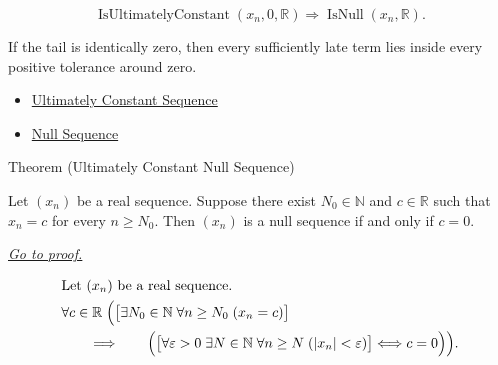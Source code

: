 \begin{remark*}
\[
\operatorname{IsUltimatelyConstant}(x_n,0,\mathbb{R})
\Longrightarrow
\operatorname{IsNull}(x_n,\mathbb{R}).
\]
\end{remark*}

\begin{remark*}[Interpretation]
If the tail is identically zero, then every sufficiently late term lies inside
every positive tolerance around zero.
\end{remark*}

\begin{dependencies}
\begin{itemize}
  \item \hyperref[def:ultimately-constant-sequence]{Ultimately Constant Sequence}
  \item \hyperref[def:null-sequence]{Null Sequence}
\end{itemize}
\end{dependencies}


\begin{theorembox}{Theorem (Ultimately Constant Null Sequence)}
\begin{theorem}
\label{thm:ultimately-constant-null-sequence}
Let $(x_n)$ be a real sequence. Suppose there exist $N_0 \in \mathbb{N}$
and $c \in \mathbb{R}$ such that $x_n = c$ for every $n \ge N_0$. Then
$(x_n)$ is a null sequence if and only if $c = 0$.

\smallskip
\noindent
\hyperref[prf:ultimately-constant-null-sequence]{\textit{Go to proof.}}
\end{theorem}
\end{theorembox}

\begin{remark*}
\[
\begin{aligned}
&\text{Let } (x_n) \text{ be a real sequence.}\\
&\forall c \in \mathbb{R}\;
\Bigl(
\bigl[
\exists N_0 \in \mathbb{N}\;
\forall n \ge N_0\;(x_n = c)
\bigr]\\
&\qquad\Longrightarrow\qquad
\Bigl(
\bigl[
\forall \varepsilon > 0\;
\exists N \in \mathbb{N}\;
\forall n \ge N\;(|x_n| < \varepsilon)
\bigr]
\Longleftrightarrow c = 0
\Bigr)
\Bigr).
\end{aligned}
\]
\end{remark*}

